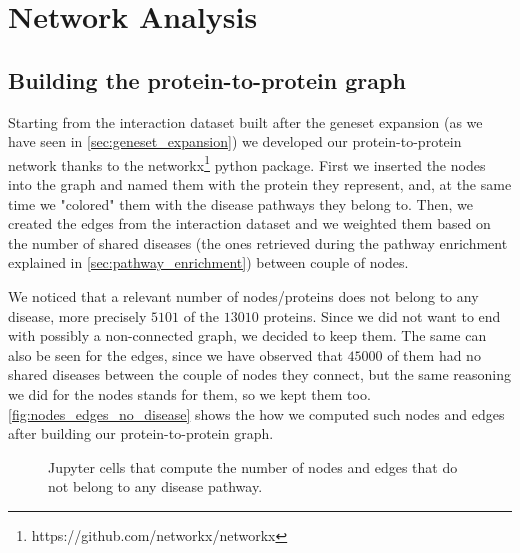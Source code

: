 \section{Network Analysis}\label{sec:network_analysis}
\subsection{Building the protein-to-protein graph}\label{subsec:protein_to_protein_graph}
Starting from the interaction dataset built after the geneset expansion (as we have seen in \autoref{sec:geneset_expansion}) we developed our protein-to-protein network thanks to the networkx\footnote{https://github.com/networkx/networkx} python package. First we inserted the nodes into the graph and named them with the protein they represent, and, at the same time we "colored" them with the disease pathways they belong to. Then, we created the edges from the interaction dataset and we weighted them based on the number of shared diseases (the ones retrieved during the pathway enrichment explained in \autoref{sec:pathway_enrichment}) between couple of nodes.
\vspace{3mm}

We noticed that a relevant number of nodes/proteins does not belong to any disease, more precisely $5101$ of the $13010$ proteins. Since we did not want to end with possibly a non-connected graph, we decided to keep them. The same can also be seen for the edges, since we have observed that $45000$ of them had no shared diseases between the couple of nodes they connect, but the same reasoning we did for the nodes stands for them, so we kept them too. \autoref{fig:nodes_edges_no_disease} shows the how we computed such nodes and edges after building our protein-to-protein graph.
\begin{figure}[H]
    \centering
    \caption{Jupyter cells that compute the number of nodes and edges that do not belong to any disease pathway.}
    \label{fig:nodes_edges_no_disease}
\end{figure}


